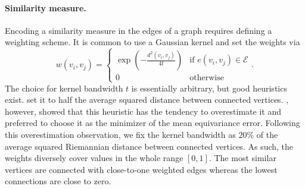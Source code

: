 \documentclass{article}
\begin{document}
\paragraph{Similarity measure.} Encoding a similarity measure in the edges of a graph requires defining a weighting scheme. It is common to use a Gaussian kernel and set the weights via
\begin{equation}
w(v_i, v_j) =
\left\{
\begin{array}{ll}
\exp \left(- \frac{d^2(v_i, v_j)}{4t}\right) & \text{if } e(v_i, v_j) \in \mathcal{E} \\
0 & \text{otherwise}
\end{array}
\right. .
\end{equation} 
The choice for kernel bandwidth $t$ is essentially arbitrary, but good heuristics exist. \citet{perraudin2019deepsphere} set it to half the average squared distance between connected vertices. \citet{defferrard2020deepsphere}, however, showed that this heuristic has the tendency to overestimate it and preferred to choose it as the minimizer of the mean equivariance error. Following this overestimation observation, we fix the kernel bandwidth as $20\%$ of the average squared Riemannian distance between connected vertices. As such, the weights diversely cover values in the whole range $[0, 1]$. The most similar vertices are connected with close-to-one weighted edges whereas the lowest connections are close to zero.
\end{document}
